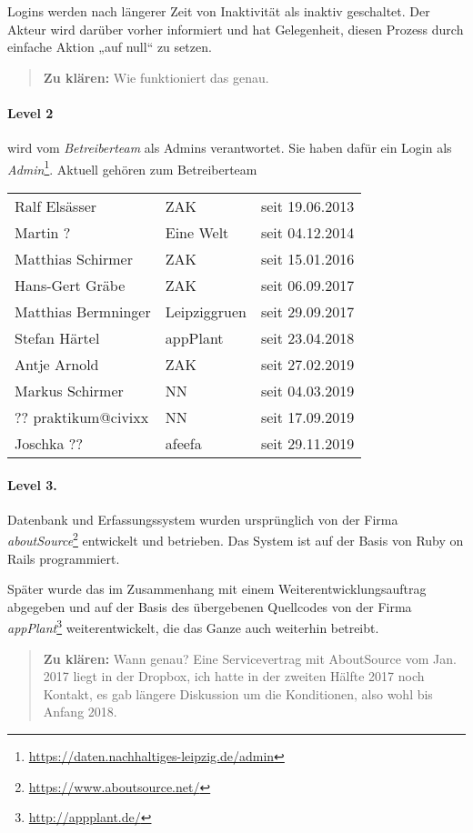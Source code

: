 \documentclass[a4paper,11pt]{article}
\newcommand{\zuklaeren}[1]{\begin{quote} \textbf{Zu klären:} #1 \end{quote}}
\begin{document}
Logins werden nach längerer Zeit von Inaktivität als inaktiv geschaltet.  Der
Akteur wird darüber vorher informiert und hat Gelegenheit, diesen Prozess
durch einfache Aktion „auf null“ zu setzen.

\zuklaeren{Wie funktioniert das genau.}

\paragraph{Level 2}
wird vom \emph{Betreiberteam} als Admins verantwortet. Sie haben dafür ein
Login als
\emph{Admin}\footnote{\url{https://daten.nachhaltiges-leipzig.de/admin}}.
Aktuell gehören zum Betreiberteam
\begin{center}
  \begin{tabular}{llc}
    Ralf Elsässer & ZAK & seit 19.06.2013\\
    Martin ? & Eine Welt & seit 04.12.2014\\
    Matthias Schirmer & ZAK & seit 15.01.2016\\
    Hans-Gert Gräbe & ZAK & seit 06.09.2017\\
    Matthias Bermninger & Leipziggruen & seit 29.09.2017\\
    Stefan Härtel & appPlant & seit 23.04.2018\\
    Antje Arnold & ZAK & seit 27.02.2019\\
    Markus Schirmer & NN & seit 04.03.2019\\
    ?? praktikum@civixx & NN & seit 17.09.2019\\
    Joschka ?? & afeefa & seit 29.11.2019
  \end{tabular}
\end{center}
\paragraph{Level 3.}
Datenbank und Erfassungssystem wurden ursprünglich von der Firma
\emph{aboutSource}\footnote{\url{https://www.aboutsource.net/}} entwickelt und
betrieben.  Das System ist auf der Basis von Ruby on Rails programmiert. 

Später wurde das im Zusammenhang mit einem Weiterentwicklungsauftrag abgegeben
und auf der Basis des übergebenen Quellcodes von der Firma
\emph{appPlant}\footnote{\url{http://appplant.de/}} weiterentwickelt, die das
Ganze auch weiterhin betreibt.

\zuklaeren{Wann genau? Eine Servicevertrag mit AboutSource vom Jan. 2017 liegt
  in der Dropbox, ich hatte in der zweiten Hälfte 2017 noch Kontakt, es gab
  längere Diskussion um die Konditionen, also wohl bis Anfang 2018.}
\end{document}
